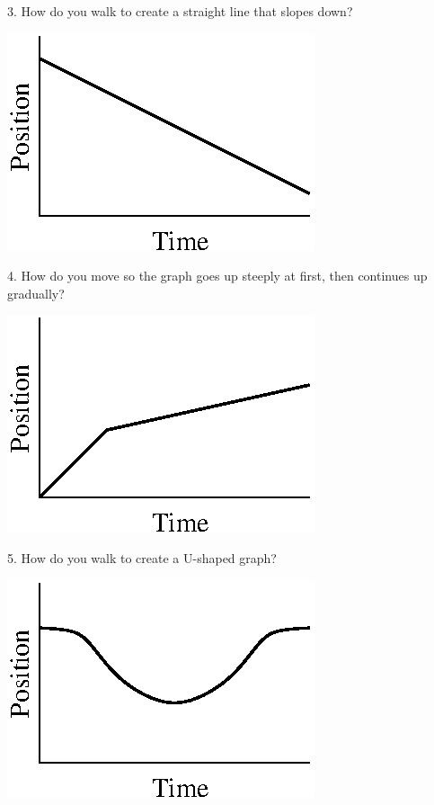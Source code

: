 3. How do you walk to create a straight line that slopes down?

\vspace{0.3cm}
{\par\raggedright \includegraphics{position_fig7.eps} \par}
\vspace{0.3cm}

4. How do you move so the graph goes up steeply at first, then continues up
gradually?

\vspace{0.3cm}
{\par\raggedright \includegraphics{position_fig8.eps} \par}
\vspace{0.3cm}

5. How do you walk to create a U-shaped graph?

\vspace{0.3cm}
{\par\raggedright \includegraphics{position_fig9.eps} \par}
\vspace{0.3cm}

